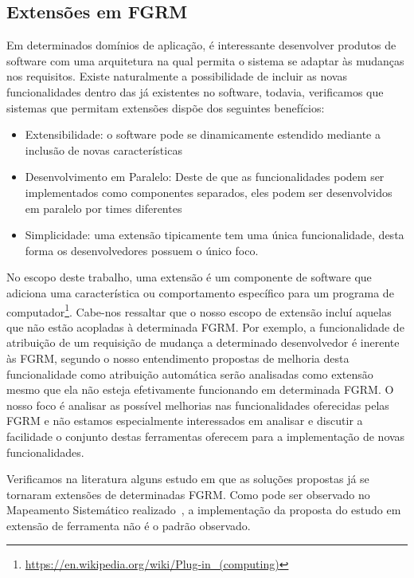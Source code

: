 \subsection{Extensões em FGRM}
\label{subsec:extensoes_fgrm}

Em determinados domínios de aplicação, é interessante desenvolver produtos de software com uma
arquitetura na qual permita o sistema se adaptar às mudanças nos requisitos. Existe naturalmente a
possibilidade de incluir as novas funcionalidades dentro das já existentes no software, todavia,
verificamos que sistemas que permitam extensões dispõe dos seguintes benefícios:

\begin{itemize}
	\item Extensibilidade: o software pode se dinamicamente estendido mediante a inclusão de novas características
	\item Desenvolvimento em Paralelo: Deste de que as funcionalidades podem ser implementados como
		componentes separados, eles podem ser desenvolvidos em paralelo por times diferentes
    \item Simplicidade: uma  extensão tipicamente tem uma única funcionalidade, desta forma os
		desenvolvedores possuem o único foco.
\end{itemize}

No escopo deste trabalho, uma extensão é um componente de software que adiciona uma característica
ou comportamento específico para um programa de
computador\footnote{\url{https://en.wikipedia.org/wiki/Plug-in_(computing)}}. Cabe-nos ressaltar que
o nosso  escopo de extensão incluí aquelas que não estão acopladas à determinada FGRM. Por exemplo,
a funcionalidade de atribuição de um requisição de mudança a determinado desenvolvedor é inerente às
FGRM, segundo o nosso entendimento propostas de melhoria desta funcionalidade como atribuição
automática serão analisadas como extensão mesmo que ela não esteja efetivamente funcionando em
determinada FGRM. O nosso foco é analisar as possível melhorias nas funcionalidades oferecidas pelas
FGRM e não estamos especialmente interessados em analisar e discutir a facilidade o conjunto destas
ferramentas oferecem para a implementação de novas funcionalidades. 

Verificamos na literatura alguns estudo em que as soluções propostas já se tornaram extensões de
determinadas FGRM. Como pode ser observado no Mapeamento Sistemático realizado~, a implementação da proposta do estudo em
extensão de ferramenta não é o padrão observado. 

